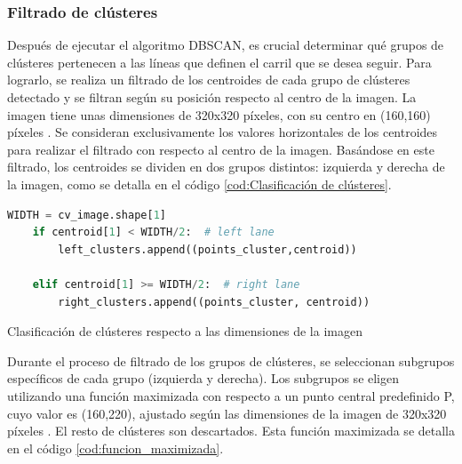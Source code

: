 \subsubsection{Filtrado de clústeres}
\label{clasificación:cluster}
Después de ejecutar el algoritmo DBSCAN, es crucial determinar qué grupos de clústeres pertenecen a las líneas que definen el carril que se desea seguir. 
Para lograrlo, se realiza un filtrado de los centroides de cada
grupo de clústeres detectado y se filtran según su posición respecto al centro de la imagen. La imagen tiene unas dimensiones de 320x320 píxeles, con su centro en (160,160) píxeles 
. Se consideran exclusivamente los valores horizontales de los centroides para realizar el filtrado con respecto al centro de la imagen. Basándose en este filtrado, 
los centroides se dividen en dos grupos distintos: izquierda y derecha de la imagen, como se detalla en el código \ref{cod:Clasificación de clústeres}. \newline

\begin{code}[h]
  \begin{lstlisting}[language=Python]
    WIDTH = cv_image.shape[1]
    if centroid[1] < WIDTH/2:  # left lane
        left_clusters.append((points_cluster,centroid))
       
    elif centroid[1] >= WIDTH/2:  # right lane
        right_clusters.append((points_cluster, centroid))
  \end{lstlisting}
  \caption[Clasificación de clústeres según las dimensiones de la imagen ]{Clasificación de clústeres respecto a las dimensiones de la imagen}
  \label{cod:Clasificación de clústeres}
  \end{code}  

Durante el proceso de filtrado de los grupos de clústeres, se seleccionan subgrupos específicos de cada grupo (izquierda y derecha). Los subgrupos se eligen utilizando una función 
maximizada con respecto a un punto central predefinido P, cuyo valor es (160,220), ajustado según las dimensiones de la imagen de 320x320 píxeles . El resto de clústeres son 
descartados. Esta función maximizada se detalla en el código \ref{cod:funcion_maximizada}. 

